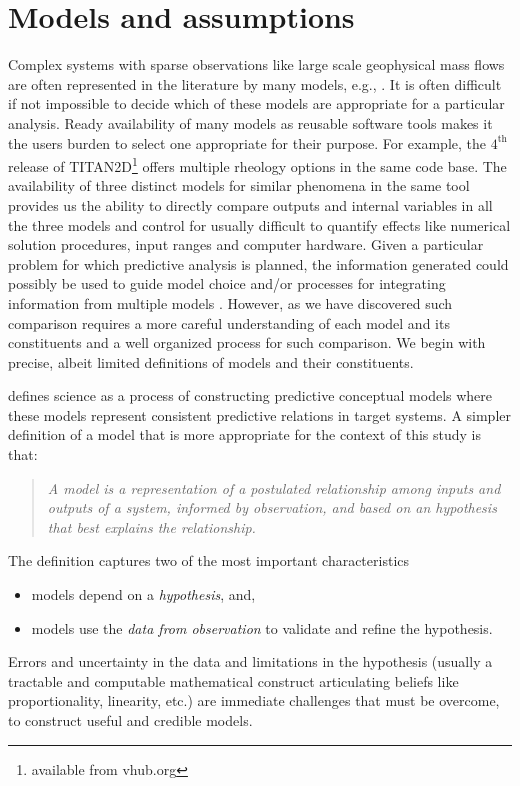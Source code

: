 \documentclass{article}
\begin{document}
\section{Models and assumptions}

Complex systems with sparse observations like large scale geophysical mass flows are often represented in the literature by many models, e.g., \cite{Kelfoun2011}. It is often difficult if not impossible to decide which of these models are appropriate for a particular analysis. Ready availability of many models as reusable software tools makes it the users burden to select one appropriate for their purpose.
For example, the $\mathrm{4^{\mathrm{th}}}$ release of TITAN2D\footnote{available from vhub.org} offers multiple rheology options in the same code base. The availability of three distinct models for similar phenomena in the same tool provides us the ability to directly compare  outputs and internal variables in all the three models and control for usually difficult to quantify effects like numerical solution procedures, input ranges and computer hardware. Given a particular problem for which predictive analysis is planned, the information generated  could possibly be used to guide model choice and/or processes for integrating information from multiple models \citep{Bongard2007}. However, as we have discovered such comparison requires a more careful understanding of each model and its constituents and a well organized process for such comparison. We begin with precise, albeit limited definitions
of models and their constituents.


\cite{Gilbert91} defines science as a process of constructing predictive conceptual models where these models represent
consistent predictive relations in target systems. A simpler definition of a model that is more appropriate for the context of this study is that:

\begin{quote}{\it A model is a representation of a postulated relationship among inputs and outputs of a system, informed by observation, and based on an hypothesis that best explains the relationship.}\end{quote} The definition captures two of the most important characteristics
\begin{itemize}
\item models depend on a {\it hypothesis}, and,
\item models use the {\it data from observation} to validate and refine the hypothesis.
\end{itemize}
Errors and uncertainty in the data and limitations in the hypothesis (usually a tractable and computable mathematical construct articulating beliefs like proportionality, linearity, etc.) are immediate challenges that must be overcome, to construct useful and credible models.
\end{document}
